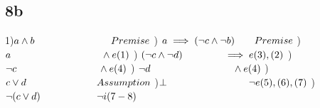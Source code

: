 \documentclass{article}
\begin{document}
	\subsection*{8b}
	1)$ a \land b \hspace{27mm} Premise$
	) $ a \implies (\neg c \land \neg b) \hspace{7mm} Premise$
	)$ a \hspace{32mm} \land e (1) $
	) $ (\neg c \land \neg d) \hspace{14mm} \implies e (3),(2)$
	) $ \neg c \hspace{29mm} \land e (4) $
	) $ \neg d \hspace{29mm} \land e (4) $
	) \hspace{25mm}$ c \lor d \hspace{25mm} Assumption $
	)\hspace{25mm}$ \bot \hspace{29mm} \neg e (5),(6),(7) $
	) $ \neg ( c \lor d) \hspace{20mm} \neg i (7-8) $
\end{document}

